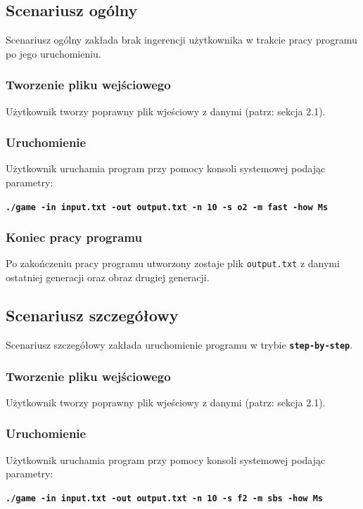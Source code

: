 \documentclass[a4paper]{article}
\begin{document}
\subsection{Scenariusz og\'olny}
\quad Scenariusz og\'olny zak\l{}ada brak ingerencji u\.zytkownika w trakcie pracy programu po jego uruchomieniu.
	\subsubsection{Tworzenie pliku wej\'sciowego}
	U\.zytkownik tworzy poprawny plik wje\'sciowy z danymi (patrz: sekcja 2.1).
	\subsubsection{Uruchomienie}
	U\.zytkownik uruchamia program przy pomocy konsoli systemowej podaj\k{a}c parametry:
	
	\begin{center}
		\texttt{\textbf{./game -in input.txt -out output.txt -n 10 -s o2 -m fast -how Ms}}
	\end{center}
	\subsubsection{Koniec pracy programu}
	Po zako\'nczeniu pracy programu utworzony zostaje plik \texttt{output.txt} z danymi ostatniej generacji oraz obraz drugiej generacji.

\subsection{Scenariusz szczeg\'o\l{}owy}
\quad Scenariusz szczeg\'o\l{}owy zak\l{}ada uruchomienie programu w trybie \texttt{\textbf{step-by-step}}.
	\subsubsection{Tworzenie pliku wej\'sciowego}
	U\.zytkownik tworzy poprawny plik wje\'sciowy z danymi (patrz: sekcja 2.1).
	\subsubsection{Uruchomienie}
	U\.zytkownik uruchamia program przy pomocy konsoli systemowej podaj\k{a}c parametry:

        \begin{center}
                \texttt{\textbf{./game -in input.txt -out output.txt -n 10 -s f2 -m sbs -how Ms}}
        \end{center}
\end{document}
